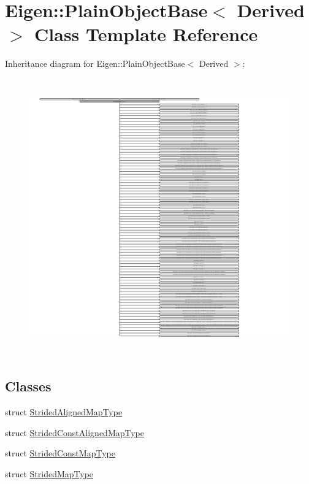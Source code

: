 \hypertarget{class_eigen_1_1_plain_object_base}{}\section{Eigen\+:\+:Plain\+Object\+Base$<$ Derived $>$ Class Template Reference}
\label{class_eigen_1_1_plain_object_base}
Inheritance diagram for Eigen\+:\+:Plain\+Object\+Base$<$ Derived $>$\+:\begin{figure}[H]
\begin{center}
\leavevmode
\includegraphics[height=12.000000cm]{class_eigen_1_1_plain_object_base}
\end{center}
\end{figure}
\subsection*{Classes}
\begin{DoxyCompactItemize}
\item 
struct \hyperlink{struct_eigen_1_1_plain_object_base_1_1_strided_aligned_map_type}{Strided\+Aligned\+Map\+Type}
\item 
struct \hyperlink{struct_eigen_1_1_plain_object_base_1_1_strided_const_aligned_map_type}{Strided\+Const\+Aligned\+Map\+Type}
\item 
struct \hyperlink{struct_eigen_1_1_plain_object_base_1_1_strided_const_map_type}{Strided\+Const\+Map\+Type}
\item 
struct \hyperlink{struct_eigen_1_1_plain_object_base_1_1_strided_map_type}{Strided\+Map\+Type}
\end{DoxyCompactItemize}
